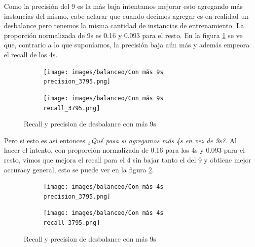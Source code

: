 Como la precisión del 9 es la más baja intentamos mejorar esto agregando más instancias del mismo, cabe aclarar que cuando decimos agregar es en realidad un desbalance pero tenemos la misma cantidad de instancias de entrenamiento. La proporción normalizada de 9s es 0.16 y 0.093 para el resto. En la figura \ref{fig:9s_recall_prec} se ve que, contrario a lo que suponíamos, la precisión baja aún más y además empeora el recall de los 4s.
\begin{figure}[h]
    \centering
    \begin{subfigure}{.5\textwidth}
        \centering
        \texttt{[image: images/balanceo/Con más 9s precision\_3795.png]}
    \end{subfigure}%
    \begin{subfigure}{.5\textwidth}
        \centering
        \texttt{[image: images/balanceo/Con más 9s recall\_3795.png]}
    \end{subfigure}%
    \caption{Recall y precision de desbalance con más 9s}
    \label{fig:9s_recall_prec}
\end{figure}

\FloatBarrier
Pero si esto es así entonces \textit{¿Qué pasa si agregamos más 4s en vez de 9s?}. Al hacer el intento, con proporción normalizada de 0.16 para los 4s y 0.093 para el resto, vimos que mejora el recall para el 4 sin bajar tanto el del 9 y obtiene mejor accuracy general, esto se puede ver en la figura \ref{fig:4s_recall_prec}.
\begin{figure}[h]
    \centering
    \begin{subfigure}{.5\textwidth}
        \centering
        \texttt{[image: images/balanceo/Con más 4s precision\_3795.png]}
    \end{subfigure}%
    \begin{subfigure}{.5\textwidth}
        \centering
        \texttt{[image: images/balanceo/Con más 4s recall\_3795.png]}
    \end{subfigure}%
    \caption{Recall y precision de desbalance con más 9s}
    \label{fig:4s_recall_prec}
\end{figure}

